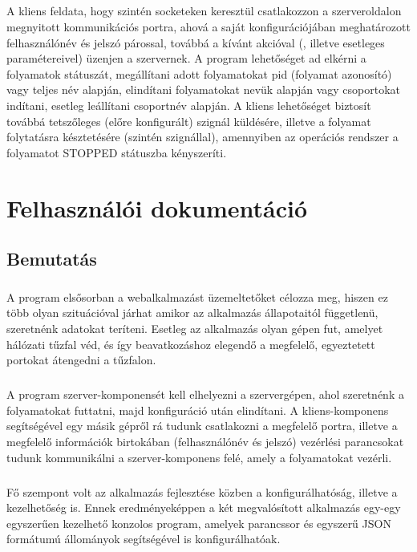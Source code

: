 \documentclass[12pt]{report}
\begin{document}
\paragraph{}
A kliens feldata, hogy szintén socketeken keresztül csatlakozzon a szerveroldalon megnyitott kommunikációs portra, ahová a saját konfigurációjában meghatározott felhasználónév és jelszó párossal, továbbá a kívánt akcióval (, illetve esetleges paramétereivel) üzenjen a szervernek. A program lehetőséget ad elkérni a folyamatok státuszát, megállítani adott folyamatokat pid (folyamat azonosító) vagy teljes név alapján, elindítani folyamatokat nevük alapján vagy csoportokat indítani, esetleg leállítani csoportnév alapján. A kliens lehetőséget biztosít továbbá tetszőleges (előre konfigurált) szignál küldésére, illetve a folyamat folytatásra késztetésére (szintén szignállal), amennyiben az operációs rendszer a folyamatot STOPPED státuszba kényszeríti.

\chapter{Felhasználói dokumentáció}
\section{Bemutatás}
\paragraph{}
A program elsősorban a webalkalmazást üzemeltetőket célozza meg, hiszen ez több olyan szituációval járhat amikor az alkalmazás állapotaitól függetlenü, szeretnénk adatokat teríteni. Esetleg az alkalmazás olyan gépen fut, amelyet hálózati tűzfal véd, és így beavatkozáshoz elegendő a megfelelő, egyeztetett portokat átengedni a tűzfalon.
\paragraph{}
A program szerver-komponensét kell elhelyezni a szervergépen, ahol szeretnénk a folyamatokat futtatni, majd konfiguráció után elindítani. A kliens-komponens segítségével egy másik gépről rá tudunk csatlakozni a megfelelő portra, illetve a megfelelő információk birtokában (felhasználónév és jelszó) vezérlési parancsokat tudunk kommunikálni a szerver-komponens felé, amely a folyamatokat vezérli.
\paragraph{}
Fő szempont volt az alkalmazás fejlesztése közben a konfigurálhatóság, illetve a kezelhetőség is. Ennek eredményeképpen a két megvalósított alkalmazás egy-egy egyszerűen kezelhető konzolos program, amelyek parancssor és egyszerű JSON formátumú állományok segítségével is konfigurálhatóak.
\end{document}

